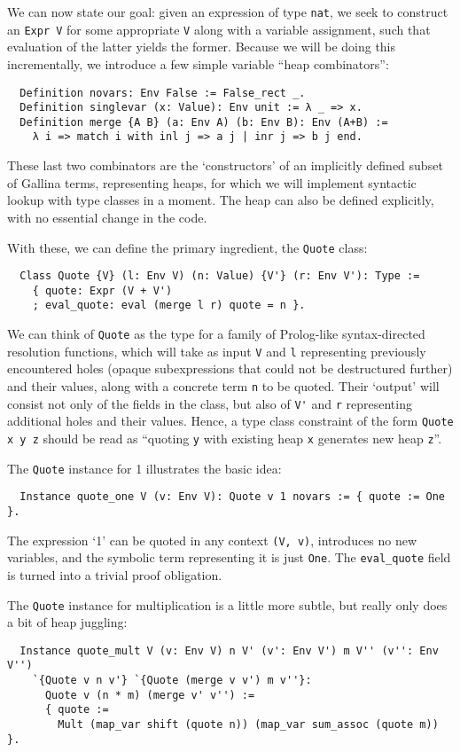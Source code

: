 \documentclass[a4paper,10pt,runningheads]{llncs}
\begin{document}
We can now state our goal: given an expression of type \lstinline|nat|, we seek to construct an \lstinline|Expr V| for some appropriate \lstinline|V| along with a variable assignment, such that evaluation of the latter yields the former. Because we will be doing this incrementally, we introduce a few simple variable ``heap combinators'':
\begin{lstlisting}
  Definition novars: Env False := False_rect _.
  Definition singlevar (x: Value): Env unit := λ _ => x.
  Definition merge {A B} (a: Env A) (b: Env B): Env (A+B) :=
    λ i => match i with inl j => a j | inr j => b j end.
\end{lstlisting}
These last two combinators are the `constructors' of an implicitly defined subset of Gallina terms, representing heaps, for which we will implement syntactic lookup with type classes in a moment. The heap can also be defined explicitly, with no essential change in the code.

With these, we can define the primary ingredient, the \lstinline|Quote| class:
\begin{lstlisting}
  Class Quote {V} (l: Env V) (n: Value) {V'} (r: Env V'): Type :=
    { quote: Expr (V + V')
    ; eval_quote: eval (merge l r) quote = n }.
\end{lstlisting}
We can think of \lstinline|Quote| as the type for a family of Prolog-like syntax-directed resolution functions, which will take as input \lstinline|V| and \lstinline|l| representing previously encountered holes (opaque subexpressions that could not be destructured further) and their values, along with a concrete term \lstinline|n| to be quoted. Their `output' will consist not only of the fields in the class, but also of \lstinline|V'| and \lstinline|r| representing additional holes and their values. Hence, a type class constraint of the form \lstinline|Quote x y z| should be read as ``quoting \lstinline|y| with existing heap \lstinline|x| generates new heap \lstinline|z|''.

The \lstinline|Quote| instance for 1 illustrates the basic idea:
\begin{lstlisting}
  Instance quote_one V (v: Env V): Quote v 1 novars := { quote := One }.
\end{lstlisting}
The expression `1' can be quoted in any context \lstinline|(V, v)|, introduces no new variables, and the symbolic term representing it is just \lstinline|One|. The \lstinline|eval_quote| field is turned into a trivial proof obligation.

The \lstinline|Quote| instance for multiplication is a little more subtle, but really only does a bit of heap juggling:
\begin{lstlisting}
  Instance quote_mult V (v: Env V) n V' (v': Env V') m V'' (v'': Env V'')
    `{Quote v n v'} `{Quote (merge v v') m v''}:
      Quote v (n * m) (merge v' v'') :=
      { quote :=
        Mult (map_var shift (quote n)) (map_var sum_assoc (quote m)) }.
\end{lstlisting}
\end{document}
